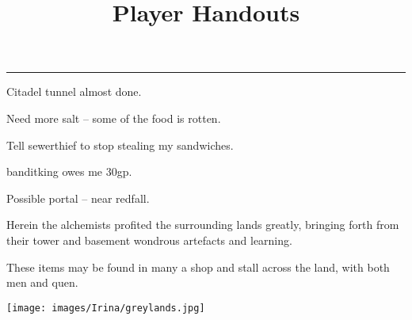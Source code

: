 \documentclass[a4paper,openany]{book}
\title{Player Handouts}
\begin{document}


\pagebreak


\hrule

\vspace{2em}

Citadel tunnel almost done.

Need more salt -- some of the food is rotten.

Tell \gls{sewerthief} to stop stealing my sandwiches.

\Gls{banditking} owes me 30gp.

Possible portal -- near \gls{redfall}.

\pagebreak



\begin{center}
\begin{minipage}{.7\textwidth}
\Large
Herein the alchemists profited the surrounding lands greatly, bringing forth from their tower and basement wondrous artefacts and learning.

These items may be found in many a shop and stall across the land, with both men and quen.

\end{minipage}
\end{center}

\pagebreak



\pagebreak

\texttt{[image: images/Irina/greylands.jpg]}

\pagebreak



\pagebreak


\pagebreak

\end{document}
